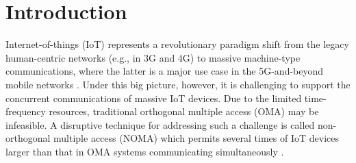 \documentclass[journal]{IEEEtran}
\begin{document}
%
\IEEEpeerreviewmaketitle



\section{Introduction}
 
  
       Internet-of-things (IoT) represents a revolutionary paradigm shift from the legacy human-centric networks (e.g., in 3G and 4G) to massive machine-type communications, where the latter is a major use case in the 5G-and-beyond mobile networks  \cite{FuqahaCommun}.
  Under this big picture, however, 
it is challenging to support the concurrent  communications of  massive IoT devices.  Due to the limited time-frequency resources, traditional  orthogonal multiple access (OMA) may be infeasible.   A disruptive technique for addressing such a challenge  is called non-orthogonal multiple access (NOMA) which permits several times of IoT devices larger than that in OMA systems communicating simultaneously \cite{SparseYu}. 
 
  
  
 
 
 


\end{document}
